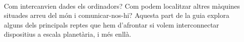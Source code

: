 \ \\[-10cm]
Com intercanvien dades els ordinadors? Com podem localitzar altres màquines situades arreu del món i comunicar-nos-hi?
Aquesta part de la guia explora alguns dels principals reptes que hem d'afrontar si volem interconnectar dispositius a escala planetària, i més enllà.
